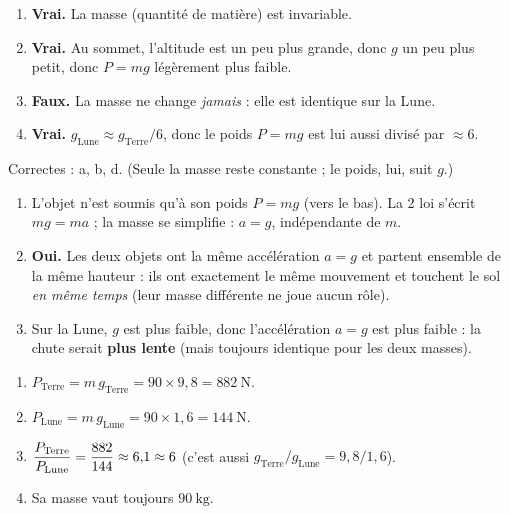 \documentclass[11pt,a4paper]{article}
\begin{document}

\begin{corrige}
\begin{enumerate}[label=\alph*)]
  \item \textbf{Vrai.} La masse (quantité de matière) est invariable.
  \item \textbf{Vrai.} Au sommet, l'altitude est un peu plus grande, donc $g$ un peu
        plus petit, donc $P=mg$ légèrement plus faible.
  \item \textbf{Faux.} La masse ne change \emph{jamais} : elle est identique sur la Lune.
  \item \textbf{Vrai.} $g_{\text{Lune}}\approx g_{\text{Terre}}/6$, donc le poids $P=mg$
        est lui aussi divisé par $\approx 6$.
\end{enumerate}
Correctes : a, b, d. (Seule la masse reste constante ; le poids, lui, suit $g$.)
\end{corrige}

\begin{corrige}
\begin{enumerate}[label=\alph*)]
  \item L'objet n'est soumis qu'à son poids $P=mg$ (vers le bas). La 2 loi
        s'écrit $mg=ma$ ; la masse se simplifie : $\boxed{a=g}$, indépendante de $m$.
  \item \textbf{Oui.} Les deux objets ont la même accélération $a=g$ et partent
        ensemble de la même hauteur : ils ont exactement le même mouvement et touchent
        le sol \emph{en même temps} (leur masse différente ne joue aucun rôle).
  \item Sur la Lune, $g$ est plus faible, donc l'accélération $a=g$ est plus faible :
        la chute serait \textbf{plus lente} (mais toujours identique pour les deux masses).
\end{enumerate}
\end{corrige}

\begin{corrige}
\begin{enumerate}[label=\alph*)]
  \item $P_{\text{Terre}}=m\,g_{\text{Terre}}=90\times 9{,}8=\qty{882}{\newton}$.
  \item $P_{\text{Lune}}=m\,g_{\text{Lune}}=90\times 1{,}6=\qty{144}{\newton}$.
  \item $\displaystyle \frac{P_{\text{Terre}}}{P_{\text{Lune}}}=\frac{882}{144}\approx 6{,}1\approx 6$
        (c'est aussi $g_{\text{Terre}}/g_{\text{Lune}}=9{,}8/1{,}6$). \checkmark
  \item Sa masse vaut toujours $\qty{90}{\kilogram}$.
\end{enumerate}
\end{corrige}
\end{document}
